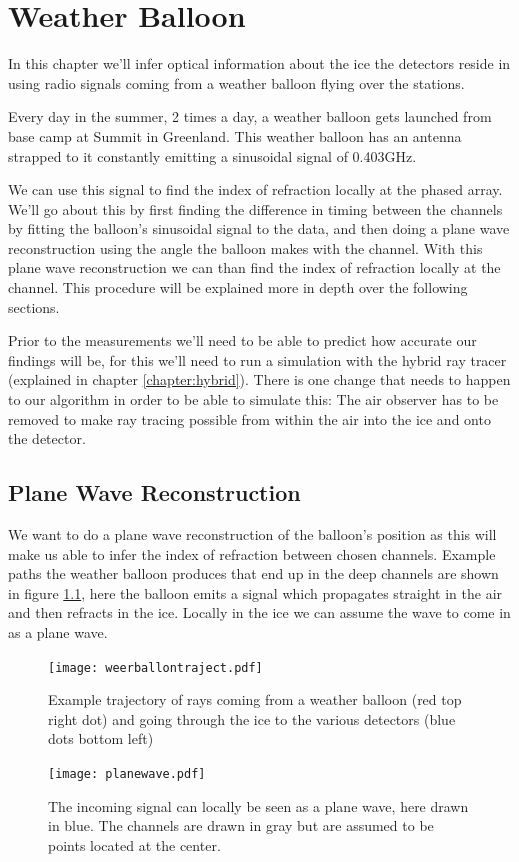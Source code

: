 \chapter{Weather Balloon}
\label{chap:WB}
In this chapter we'll infer optical information about the ice the detectors reside in
using radio signals coming from a weather balloon flying over the stations. 

Every day in the summer, 2 times a day, a weather balloon gets launched
from base camp at Summit in Greenland. This weather balloon has an antenna
strapped to it constantly emitting a sinusoidal signal of 0.403GHz.

We can use this signal to find the index of refraction locally at the phased
array.  We'll go about this by first finding the difference in timing between the
channels by fitting the balloon's sinusoidal signal to the data, and then doing
a plane wave reconstruction using the angle the balloon makes with the channel.
With this plane wave reconstruction we can than find the index of refraction locally at the channel.  This procedure will
be explained more in depth over the following sections.

Prior to the measurements we'll need to be able to predict how accurate our
findings will be, for this we'll need to run a simulation with the hybrid ray
tracer (explained in chapter \ref{chapter:hybrid}).  
There is one change that needs to happen to our algorithm in order
to be able to simulate this: The air observer has to be removed to make
ray tracing possible from within the air into the ice and onto the detector\cite{hybrid}.

\section{Plane Wave Reconstruction}
We want to do a plane wave reconstruction of the balloon's position as this
will make us able to infer the index of refraction between chosen channels.
Example paths the weather balloon produces that end up in the deep channels are
shown in figure \ref{fig:Example trajectory}, here the balloon emits a signal
which propagates straight in the air and then refracts in the ice. Locally in
the ice we can assume the wave to come in as a plane wave.
\begin{figure}
	\centering
	\texttt{[image: weerballontraject.pdf]}
	\caption{Example trajectory of rays coming from a weather balloon (red top right dot) and going through the ice to the various detectors (blue dots bottom left)}
	\label{fig:Example trajectory}
\end{figure}
\begin{figure}
	\centering
	\texttt{[image: planewave.pdf]}
	\caption{The incoming signal can locally be seen as a plane wave, here drawn in blue. The channels are drawn in gray but are assumed to be points located at the center.}	
	\label{fig:Plane Wave}
\end{figure}


